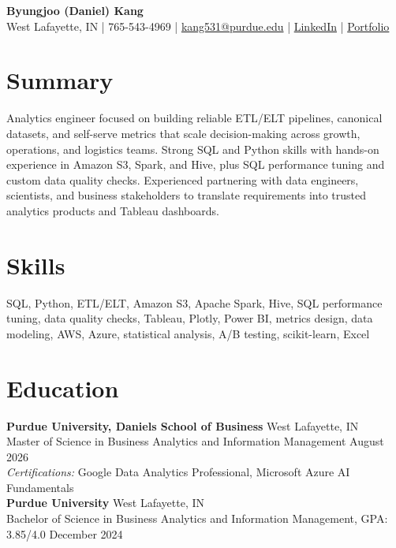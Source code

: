 \documentclass[11pt,a4paper]{article}
\begin{document}
\pagestyle{empty}

\begin{center}
    {\Huge \textbf{Byungjoo (Daniel) Kang}} \\[4pt]
    West Lafayette, IN | 765-543-4969 | \href{mailto:kang531@purdue.edu}{kang531@purdue.edu} |
    \href{https://www.linkedin.com/in/daniel-byungjoo-kang/}{LinkedIn} | \href{https://daniel-kang-vs.github.io}{Portfolio}
\end{center}

\section*{Summary}
Analytics engineer focused on building reliable ETL/ELT pipelines, canonical datasets, and self-serve metrics that scale decision-making across growth, operations, and logistics teams. Strong SQL and Python skills with hands-on experience in Amazon S3, Spark, and Hive, plus SQL performance tuning and custom data quality checks. Experienced partnering with data engineers, scientists, and business stakeholders to translate requirements into trusted analytics products and Tableau dashboards.

\section*{Skills}
SQL, Python, ETL/ELT, Amazon S3, Apache Spark, Hive, SQL performance tuning, data quality checks, Tableau, Plotly, Power BI, metrics design, data modeling, AWS, Azure, statistical analysis, A/B testing, scikit-learn, Excel

\section*{Education}
\noindent
\textbf{Purdue University, Daniels School of Business} \hfill West Lafayette, IN \\
Master of Science in Business Analytics and Information Management \hfill August 2026 \\
\textit{Certifications:} Google Data Analytics Professional, Microsoft Azure AI Fundamentals \\[6pt]
\textbf{Purdue University} \hfill West Lafayette, IN \\
Bachelor of Science in Business Analytics and Information Management, GPA: 3.85/4.0 \hfill December 2024
\end{document}
